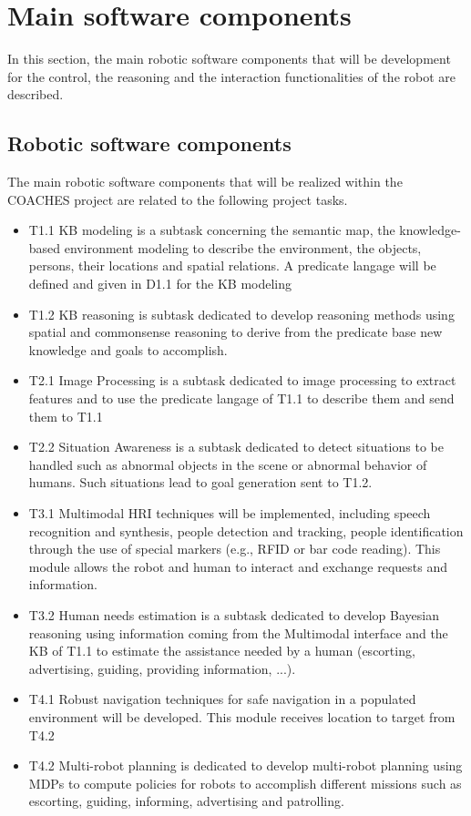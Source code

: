 \documentclass{article}
\begin{document}
\section{Main software components}

In this section, the main robotic software components that will be development for the control, the reasoning and the interaction functionalities of the robot are described.

\subsection{Robotic software components}

The main robotic software components that will be realized within the COACHES project are related to the following project tasks.
\begin{itemize}
\item T1.1 KB modeling is a subtask concerning the semantic map, the knowledge-based  environment modeling to describe the environment, the objects, persons, their locations and spatial relations. A predicate langage will be defined and given in D1.1 for the KB modeling
\item T1.2 KB reasoning is subtask dedicated to develop reasoning methods using spatial and commonsense reasoning to derive from the predicate base new knowledge and goals to accomplish.
\item T2.1 Image Processing is  a subtask dedicated to image processing to extract features and to use the predicate langage of T1.1 to describe them and send them to T1.1
\item T2.2 Situation Awareness is a subtask dedicated to detect situations to be handled such as abnormal objects in the scene or abnormal behavior of humans. Such situations lead to goal generation sent to T1.2.
\item T3.1 Multimodal HRI techniques  will be implemented, including speech recognition and synthesis, people detection and tracking, people identification through the use of special markers (e.g., RFID or bar code reading). This module allows the robot and human to interact and exchange requests and information. 
\item T3.2 Human needs estimation is a subtask dedicated to develop Bayesian reasoning using information coming from the Multimodal interface and the KB of T1.1 to estimate the assistance needed by a human (escorting, advertising, guiding, providing information, ...). 
\item T4.1 Robust navigation techniques for safe navigation in a populated environment will be developed. This module receives location to target from T4.2
\item T4.2 Multi-robot planning is dedicated to develop multi-robot planning using MDPs to compute policies for robots to accomplish different missions such as escorting, guiding, informing, advertising and patrolling. 
\end{itemize}
\end{document}
